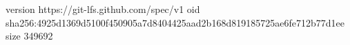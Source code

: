 version https://git-lfs.github.com/spec/v1
oid sha256:4925d1369d5100f450905a7d8404425aad2b168d819185725ae6fe712b77d1ee
size 349692
